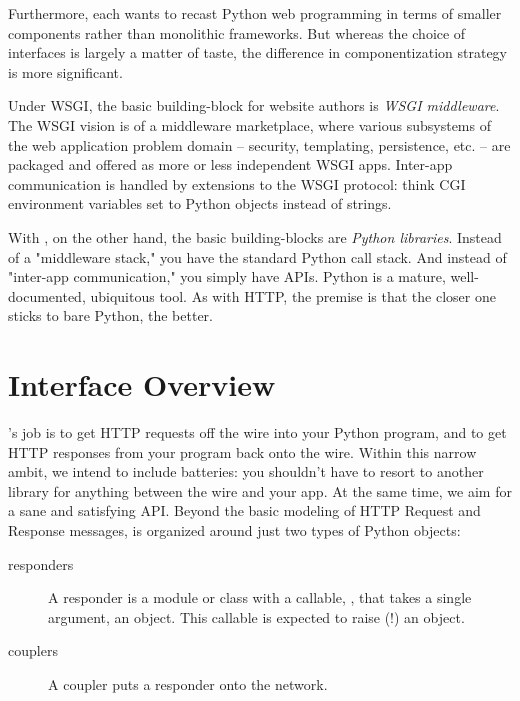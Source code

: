 Furthermore, each wants to recast Python web programming in terms of smaller
components rather than monolithic frameworks. But whereas the choice of
interfaces is largely a matter of taste, the difference in componentization
strategy is more significant.

Under WSGI, the basic building-block for website authors is \emph{WSGI
middleware}. The WSGI vision is of a middleware marketplace, where various
subsystems of the web application problem domain -- security, templating,
persistence, etc. -- are packaged and offered as more or less independent WSGI
apps. Inter-app communication is handled by extensions to the WSGI protocol:
think CGI environment variables set to Python objects instead of strings.

With , on the other hand, the basic building-blocks are
\emph{Python libraries}. Instead of a "middleware stack," you have the standard
Python call stack. And instead of "inter-app communication," you simply have
APIs. Python is a mature, well-documented, ubiquitous tool. As with HTTP, the
premise is that the closer one sticks to bare Python, the better.


\section{Interface Overview}

's job is to get HTTP requests off the wire into your Python
program, and to get HTTP responses from your program back onto the wire. Within
this narrow ambit, we intend to include batteries: you shouldn't have to resort
to another library for anything between the wire and your app. At the same time,
we aim for a sane and satisfying API. Beyond the basic modeling of HTTP Request
and Response messages,  is organized around just two types of
Python objects:

\begin{description}

\item[responders]
    {A responder is a module or class with a callable, , that
    takes a single argument, an  object. This callable is
    expected to raise (!) an  object.}

\item[couplers]
    {A coupler puts a responder onto the network.}

\end{description}

